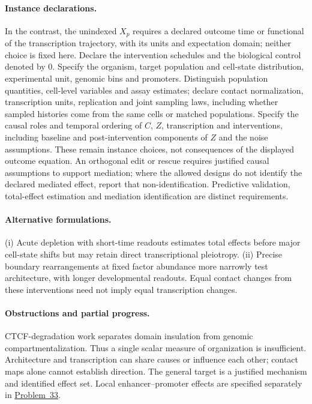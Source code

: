 \documentclass[11pt]{article}
\begin{document}
\paragraph{Instance declarations.} In the contrast, the unindexed $X_p$ requires a declared outcome time or functional of the transcription trajectory, with its units and expectation domain; neither choice is fixed here. Declare the intervention schedules and the biological control denoted by $0$. Specify the organism, target population and cell-state distribution, experimental unit, genomic bins and promoters. Distinguish population quantities, cell-level variables and assay estimates; declare contact normalization, transcription units, replication and joint sampling laws, including whether sampled histories come from the same cells or matched populations. Specify the causal roles and temporal ordering of $C$, $Z$, transcription and interventions, including baseline and post-intervention components of $Z$ and the noise assumptions. These remain instance choices, not consequences of the displayed outcome equation. An orthogonal edit or rescue requires justified causal assumptions to support mediation; where the allowed designs do not identify the declared mediated effect, report that non-identification. Predictive validation, total-effect estimation and mediation identification are distinct requirements.

\paragraph{Alternative formulations.} (i) Acute depletion with short-time readouts estimates total effects before major cell-state shifts but may retain direct transcriptional pleiotropy. (ii) Precise boundary rearrangements at fixed factor abundance more narrowly test architecture, with longer developmental readouts. Equal contact changes from these interventions need not imply equal transcription changes.
\paragraph{Obstructions and partial progress.} CTCF-degradation work separates domain insulation from genomic compartmentalization. Thus a single scalar measure of organization is insufficient. Architecture and transcription can share causes or influence each other; contact maps alone cannot establish direction. The general target is a justified mechanism and identified effect set. Local enhancer--promoter effects are specified separately in \href{https://we-solve.github.io/problems/enhancer-promoter-assignment-1403a6e1/}{Problem~33}.
\end{document}
